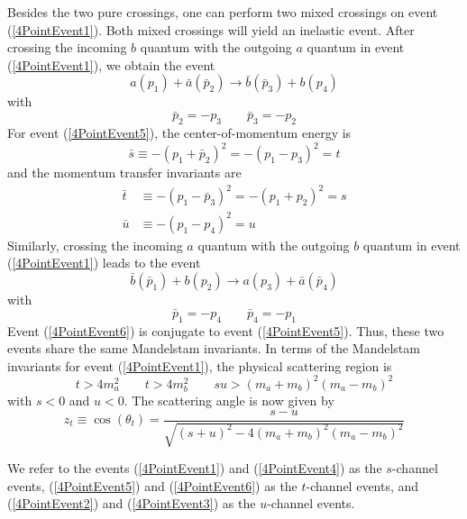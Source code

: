 Besides the two pure crossings, one can perform two mixed crossings on event (\ref{4PointEvent1}). Both mixed crossings will yield an inelastic event. After crossing the incoming $b$ quantum with the outgoing $a$ quantum in event (\ref{4PointEvent1}), we obtain the event
\begin{equation}
	a(p_{1}) + \bar{a}(\bar{p}_{2}) \longrightarrow \bar{b}(\bar{p}_{3}) + b(p_{4}) \label{4PointEvent5}
\end{equation}
with
\begin{equation}
	\bar{p}_{2} = - p_{3} \qquad \bar{p}_{3} = - p_{2}
\end{equation}
For event (\ref{4PointEvent5}), the center-of-momentum energy is
\begin{equation}
	\bar{s} \equiv - (p_{1} + \bar{p}_{2})^{2} = -(p_{1} - p_{3})^{2} = t
\end{equation}
and the momentum transfer invariants are
\begin{align}
	\bar{t} &\equiv - (p_{1} - \bar{p}_{3})^{2} = -(p_{1} + p_{2})^{2} = s \\
	\bar{u} &\equiv - (p_{1} - p_{4})^{2} = u
\end{align}
Similarly, crossing the incoming $a$ quantum with the outgoing $b$ quantum in event (\ref{4PointEvent1}) leads to the event
\begin{equation}
	\bar{b}(\bar{p}_{1}) + b(p_{2}) \longrightarrow a(p_{3}) + \bar{a}(\bar{p}_{4}) \label{4PointEvent6}
\end{equation}
with
\begin{equation}
	\bar{p}_{1} = - p_{4} \qquad \bar{p}_{4} = - p_{1}
\end{equation}
Event (\ref{4PointEvent6}) is conjugate to event (\ref{4PointEvent5}). Thus, these two events share the same Mandelstam invariants. In terms of the Mandelstam invariants for event (\ref{4PointEvent1}), the physical scattering region is
\begin{equation}
	t > 4m_{a}^{2} \qquad t > 4m_{b}^{2} \qquad s u > (m_{a} + m_{b})^{2} (m_{a} - m_{b})^{2} \label{PSRt}
\end{equation}
with $s < 0$ and $u < 0$. The scattering angle is now given by
\begin{equation}
	z_{t} \equiv \cos{(\theta_{t})} = \frac{s - u}{\sqrt{(s + u)^{2} - 4 (m_{a} + m_{b})^{2} (m_{a} - m_{b})^{2} }}
\end{equation}

We refer to the events (\ref{4PointEvent1}) and (\ref{4PointEvent4}) as the $s$-channel events, (\ref{4PointEvent5}) and (\ref{4PointEvent6}) as the $t$-channel events, and (\ref{4PointEvent2}) and (\ref{4PointEvent3}) as the $u$-channel events.
